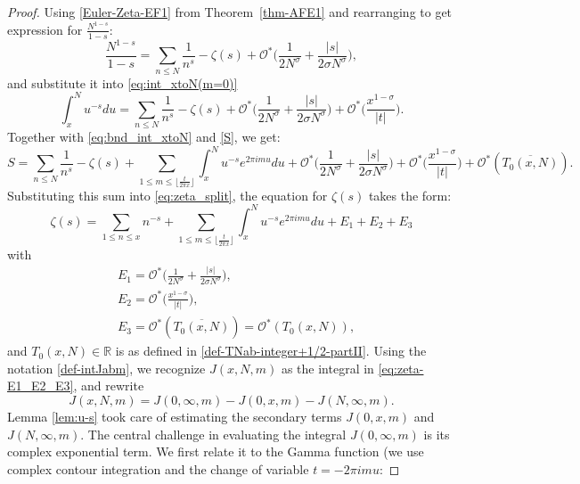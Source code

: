 \documentclass[11pt,letterpaper,oneside,reqno]{amsart}
\renewcommand{\^}[1]{\widehat{#1}}
\newcommand{\R}{{\mathbb{R}}}
\newcommand{\s}{\sigma}
\numberwithin{equation}{section}
\theoremstyle{remark}
\newcommand*{\thmref}[1]{Theorem~\ref{#1}}
\begin{document}
\begin{proof}
Using \eqref{Euler-Zeta-EF1} from \thmref{thm-AFE1} and
rearranging to get expression for  $\frac{N^{1-s}}{1-s}$:
\begin{equation}
    \frac{N^{1-s}}{1-s}=\sum_{n\leq N}\frac{1}{n^{s}}-\zeta(s)+\mathcal{O}^* \bigg(\frac{1}{2N^{\s}}+\frac{|s|}{2\s N^{\s}}\bigg),\label{T0-sum-xtoM-Euler-Zeta-EF2}
\end{equation}
and substitute it into \eqref{eq:int_xtoN(m=0)}
\begin{equation}
    \int_x^Nu^{-s}du=\sum_{n\leq N}\frac{1}{n^{s}}-\zeta(s)+\mathcal{O}^* \bigg(\frac{1}{2N^{\s}}+\frac{|s|}{2\s N^{\s}}\bigg)+\mathcal{O}^*\bigg(\frac{x^{1-\sigma}}{|t|}\bigg).\label{eq:bnd_int_xtoN}
\end{equation}
Together with \eqref{eq:bnd_int_xtoN} 
and \eqref{S}, we get:
\begin{equation}
S= \sum_{n\leq N}\frac{1}{n^{s}}-\zeta(s)+\sum_{1\leq m \leq \lfloor\frac{t}{2 \pi x}\rfloor}\int_x^N u^{-s}e^{2 \pi i m u} du +\mathcal{O}^* \bigg(\frac{1}{2N^{\s}}+\frac{|s|}{2\s N^{\s}} \bigg)+ \mathcal{O}^* \bigg(\frac{x^{1-\s}}{|t|}\bigg)+\mathcal{O}^*(\overline{T_0(x,N)}).
\end{equation}
Substituting this sum into \eqref{eq:zeta_split}, the equation for $\zeta(s)$ takes the form:
\begin{equation}
    \zeta(s) = \sum_{1 \leq n \leq x} n^{-s} + \sum_{1\leq m \leq \lfloor\frac{t}{2 \pi x}\rfloor}\int_x^N u^{-s}e^{2 \pi i m u} du   + E_1+E_2+E_3 \label{eq:zeta-E1_E2_E3}
\end{equation}
with
 \begin{align}
 \label{def-E1}
 &       E_1=\mathcal{O}^* {\bigg(\frac{1}{2N^{\s}}+\frac{|s|}{2\s N^{\s}} \bigg)},
\\ & \label{def-E2}
E_2= \mathcal{O}^* \bigg(\frac{x^{1-\s}}{|t|}\bigg),
\\&
\label{def-E3}
E_3=\mathcal{O}^*(\overline{T_0(x,N)})=\mathcal{O}^*(T_0(x,N)),
\end{align}
and $T_0(x,N)\in\R$ is as defined in \eqref{def-TNab-integer+1/2-partII}.
Using the notation \eqref{def-intJabm}, we recognize $J(x,N,m)$ 
as the integral in \eqref{eq:zeta-E1_E2_E3}, 
and rewrite 
\[
J(x,N,m) = J(0,\infty,m) - J(0,x,m) - J(N,\infty,m).
\]
Lemma \ref{lem:u-s} took care of estimating the secondary terms $J(0,x,m)$ and $J(N,\infty,m).$
The central challenge in evaluating the integral $J(0,\infty,m)$ is its complex exponential term. We first relate it to the Gamma function (we use complex contour integration and the change of variable $t = -2\pi imu$:

\end{proof}
\end{document}
